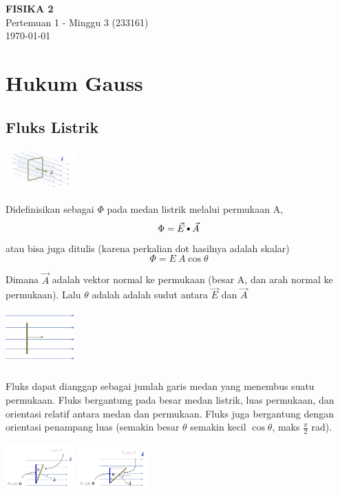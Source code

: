 \documentclass[twocolumn, 11pt]{article}%
\newcommand\sbullet[1][.5]{\mathbin{\ThisStyle{\vcenter{\hbox{%
  \scalebox{#1}{$\SavedStyle\bullet$}}}}}%
}
\begin{document}
\begin{strip}
  \vspace*{\dimexpr-\stripsep}
  \begin{center}
      \Large\textbf{FISIKA 2}\\
      \large{Pertemuan 1 - Minggu 3 (233161)}\\
      \large{\today}
   \end{center}
\end{strip}

\section{Hukum Gauss}
    \subsection{Fluks Listrik}%
    \begin{center}
        \includegraphics[width=100px]{1.png}
    \end{center}
    Didefinisikan sebagai $\Phi$ pada medan listrik melalui permukaan A,
    \[\Phi = \vec E \sbullet[.75] \vec A \]
    atau bisa juga ditulis (karena perkalian dot hasilnya adalah skalar)
    \[ \Phi = E\ A \cos \theta \]

    Dimana $\vec A$ adalah vektor normal ke permukaan (besar A, dan arah normal ke permukaan). Lalu $\theta$ adalah  adalah sudut antara $\vec E$ dan $\vec A$

    \begin{center}
        \includegraphics[width=100px]{2.png}
    \end{center}

    Fluks dapat dianggap sebagai jumlah garis medan yang menembus suatu permukaan. Fluks bergantung pada besar medan listrik, luas permukaan, dan orientasi relatif antara medan dan permukaan. Fluks juga bergantung dengan orientasi penampang luas (semakin besar $\theta$ semakin kecil $\cos \theta$, maks $\frac{\pi}{2}$ rad).
    \begin{center}
        \includegraphics[width=100px]{3.png}
        \includegraphics[width=100px]{4.png}
    \end{center}
\end{document}
